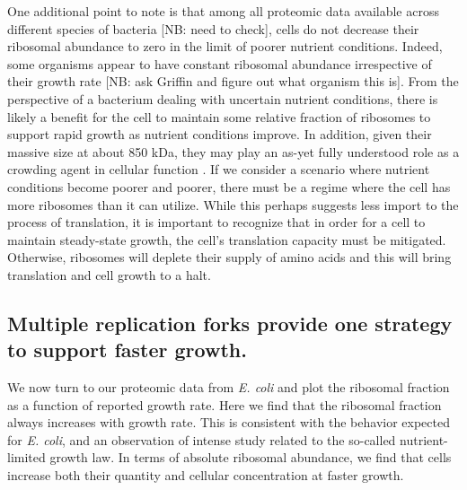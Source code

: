 One additional point to note is that among all proteomic data available across
different species of bacteria [NB: need to check], cells do not decrease their
ribosomal abundance to zero in the limit of poorer nutrient conditions. Indeed,
some organisms appear to have constant ribosomal abundance irrespective of their
growth rate [NB: ask Griffin and figure out what organism this is]. From the
perspective of a bacterium dealing with uncertain nutrient conditions, there is
likely a benefit for the cell to maintain some relative fraction of ribosomes to
support rapid growth as nutrient conditions improve. In addition, given their
massive size at about 850 kDa, they may play an as-yet fully understood role as
a crowding agent in cellular function \cite{delarue2018, solerbistue2020}. If we
consider a scenario where nutrient conditions become poorer and poorer, there
must be a regime where the cell has more ribosomes than it can utilize. While
this perhaps suggests less import to the  process of translation, it is
important to recognize that in order for a cell to maintain steady-state growth,
the cell's translation capacity must be mitigated. Otherwise, ribosomes will
deplete their supply of amino acids and this will bring translation and cell
growth to a halt.


\subsection{Multiple replication forks provide one strategy to support faster growth.}


We now turn to our proteomic data from \textit{E. coli} and plot the ribosomal
fraction as a function of reported growth rate. Here we find that the ribosomal
fraction always increases with growth rate. This is consistent with the behavior
expected for \textit{E. coli}, and an observation of intense study related to
the so-called nutrient-limited growth law. In terms of absolute ribosomal
abundance, we find that cells increase both their quantity and cellular
concentration at faster growth.

